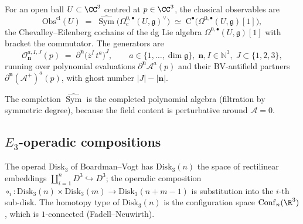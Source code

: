 \begin{definition}
\label{def:E3-local-obs}
For an open ball $U\subset\CC^3$ centred at $p\in\CC^3$, the classical
observables are
\[
\mathrm{Obs}^{\mathrm{cl}}(U)
\;=\;
\widehat{\operatorname{Sym}}\bigl(\Omega^{0,\bullet}_c(U,\mathfrak{g})^\vee\bigr)
\;\simeq\;
\mathrm{C}^\bullet\bigl(\Omega^{0,\bullet}(U,\mathfrak{g})[1]\bigr),
\]
the Chevalley--Eilenberg cochains of the dg Lie algebra
$\Omega^{0,\bullet}(U,\mathfrak{g})[1]$ with bracket the commutator.
The generators are
\[
\mathcal{O}^{a,I,J}_{\mathbf{n}}(p)
\;=\;
\partial^{\mathbf{n}}\bigl(\bar z^I\,t^a\bigr)^{J},
\qquad
a\in\{1,\dots,\dim\mathfrak{g}\},\;
\mathbf{n},I\in\mathbb{N}^3,\;
J\subset\{1,2,3\},
\]
running over polynomial evaluations $\partial^{\mathbf{n}}\mathcal{A}^a(p)$ and
their BV-antifield partners
$\partial^{\mathbf{n}}(\mathcal{A}^+)^a(p)$, with ghost number $|J|-|\mathbf{n}|$.
\end{definition}

\begin{remark}
The completion $\widehat{\operatorname{Sym}}$ is the completed
polynomial algebra (filtration by symmetric degree), because the field
content is perturbative around $\mathcal{A}=0$.
\end{remark}

\subsection{$E_3$-operadic compositions}
\label{subsec:E3-ops}

\begin{definition}
The operad $\mathrm{Disk}_3$ of Boardman--Vogt has
$\mathrm{Disk}_3(n)$ the space of rectilinear embeddings
$\coprod_{i=1}^n D^3 \hookrightarrow D^3$; the operadic composition
$\circ_i\colon \mathrm{Disk}_3(n)\times \mathrm{Disk}_3(m)\to
\mathrm{Disk}_3(n+m-1)$ is substitution into the $i$-th sub-disk. The
homotopy type of $\mathrm{Disk}_3(n)$ is the configuration space
$\mathrm{Conf}_n(\R^3)$, which is $1$-connected (Fadell--Neuwirth).
\end{definition}

